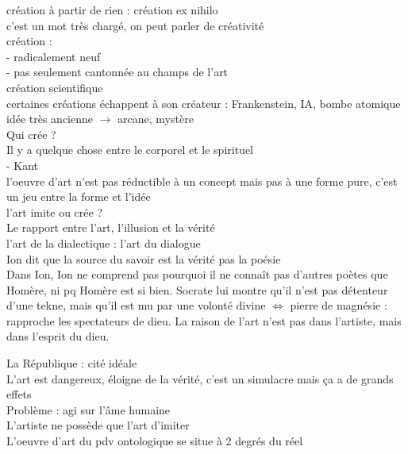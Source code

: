 \documentclass[a4paper,twocolumn,landscape]{article}
\begin{document}
création à partir de rien : création ex nihilo\\
c'est un mot très chargé, on peut parler de créativité\\

création :\\
- radicalement neuf\\
- pas seulement cantonnée au champs de l'art \\

création scientifique\\
certaines créations échappent à son créateur : Frankenstein, IA, bombe atomique\\
idée très ancienne \(\rightarrow\) arcane, mystère\\

Qui crée ? \\
Il y a quelque chose entre le corporel et le spirituel \\

- Kant\\
l'oeuvre d'art n'est pas réductible à un concept  mais pas à une forme pure, c'est un jeu entre la forme et l'idée \\

l'art imite ou crée ? \\
Le rapport entre l'art, l'illusion et la vérité\\

l'art de la dialectique : l'art du dialogue \\

Ion dit que la source du savoir est la vérité pas la poésie \\
Dans Ion, Ion ne comprend pas pourquoi il ne connaît pas d'autres poètes que Homère, ni pq Homère est si bien. Socrate lui montre
qu'il n'est pas détenteur d'une tekne, mais qu'il est mu par une volonté divine 
\(\Leftrightarrow\) pierre de magnésie : rapproche les spectateurs de dieu. 
La raison de l'art n'est pas dans l'artiste, mais dans l'esprit du dieu. 

La République : cité idéale \\

L'art est dangereux, éloigne de la vérité, c'est un simulacre mais ça a de grands effets\\
Problème : agi sur l'âme humaine\\

L'artiste ne possède que l'art d'imiter \\
L'oeuvre d'art du pdv ontologique se situe à 2 degrés du réel\\
\end{document}
